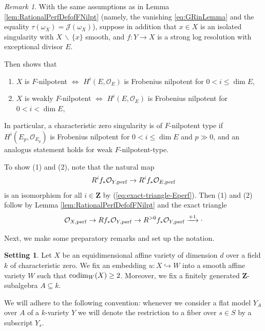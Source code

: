 \documentclass[letterpaper,11pt]{amsart}
\theoremstyle{plain}
\theoremstyle{definition}
\newtheorem{setting}[thm]{Setting}
\theoremstyle{remark}
\newtheorem{rmk}[thm]{Remark}
\def\Z{{\mathbf Z}}
\def\cO{\mathcal{O}}
\def\J{\mathcal{J}}
\def\.{\cdot}
\begin{document}
\begin{rmk}
With the same assumptions as in Lemma \ref{lem:RationalPerfDefofFNilpt} (namely, the vanishing \eqref{eq:GRinLemma} and the equality $\tau(\omega_X) = \J(\omega_X)$), suppose in addition that $x \in X$ is an isolated singularity with $X \, \backslash\, \{x\}$ smooth, and $f \colon Y \to X$ is a strong log resolution with exceptional divisor $E$.

Then \cite{Srinivas-Takagi} shows that 
\begin{enumerate}
    \item $X$ is $F$-nilpotent $\iff$ $H^i(E,\cO_E)$ is Frobenius nilpotent for $0 < i \leq \dim E$,
    \item $X$ is weakly $F$-nilpotent $\iff$ $H^i(E,\cO_E)$ is Frobenius nilpotent for $0 < i < \dim E$, 
\end{enumerate}
In particular, a characteristic zero singularity is of $F$-nilpotent type if $H^i(E_p,\cO_{E_p})$ is Frobenius nilpotent for $0 < i \leq \dim E$ and $p \gg 0$, and an analogus statement holds for weak $F$-nilpotent-type.

To show (1) and (2), note that the natural map
\[
R^if_*\cO_{Y,{\rm perf}} \to R^if_*\cO_{E,{\rm perf}}
\]
is an isomorphism for all $i \in \Z$ by (\ref{eq:exact-triangle-Eperf}).  Then (1) and (2) follow by Lemma \ref{lem:RationalPerfDefofFNilpt} and the exact triangle
\[
\cO_{X, {\rm perf}} \to Rf_*\cO_{Y, {\rm perf}} \to R^{>0}f_*\cO_{Y, {\rm perf}} \xrightarrow{+1}\.
\]
\end{rmk}


Next, we make some preparatory remarks and set up the notation. 
\begin{setting} \label{setting:char0}
Let $X$ be an equidimensional affine variety of dimension $d$ over a field $k$ of characteristic zero. We fix an embedding $u \colon X \hookrightarrow W$ into a smooth affine variety $W$ such that ${\rm codim}_W(X) \geq 2$. Moreover, we fix a finitely generated $\Z$-subalgebra $A \subseteq k$.  

We will adhere to the following convention: whenever we consider a flat model $Y_A$ over $A$ of a $k$-variety $Y$ we will denote the restriction to a fiber over $s \in S$ by a subscript $Y_s$. 
\end{setting}
\end{document}
